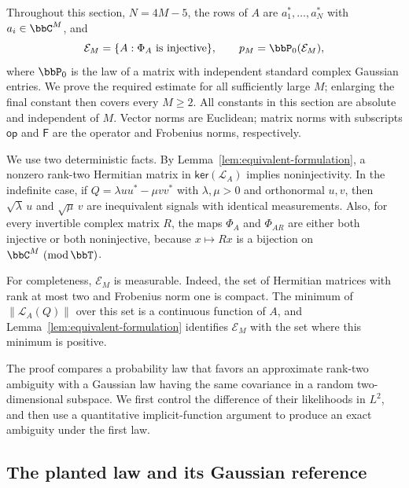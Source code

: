 \documentclass[11pt,reqno]{amsart}
\def\ker{{\mathsf{ker}}}
\begin{document}
Throughout this section, $N=4M-5$, the rows of $A$ are $a_1^*,\ldots,a_N^*$ with $a_i\in\bbC^M$, and
\[
 \mathcal E_M=\{A:\Phi_A\text{ is injective}\},\qquad
 p_M=\bbP_0(\mathcal E_M),
\]
where $\bbP_0$ is the law of a matrix with independent standard complex Gaussian entries. We prove the required estimate for all sufficiently large $M$; enlarging the final constant then covers every $M\ge2$. All constants in this section are absolute and independent of $M$.
Vector norms are Euclidean; matrix norms with subscripts $\mathsf{op}$ and $\mathsf{F}$ are the operator and Frobenius norms, respectively.

We use two deterministic facts. By Lemma~\ref{lem:equivalent-formulation}, a nonzero rank-two Hermitian matrix in $\ker(\mathcal L_A)$ implies noninjectivity. In the indefinite case, if $Q=\lambda uu^*-\mu vv^*$ with $\lambda,\mu>0$ and orthonormal $u,v$, then $\sqrt\lambda\,u$ and $\sqrt\mu\,v$ are inequivalent signals with identical measurements. Also, for every invertible complex matrix $R$, the maps $\Phi_A$ and $\Phi_{AR}$ are either both injective or both noninjective, because $x\mapsto Rx$ is a bijection on $\bbC^M\ (\operatorname{mod}\bbT)$.

For completeness, $\mathcal E_M$ is measurable. Indeed, the set of Hermitian matrices with rank at most two and Frobenius norm one is compact. The minimum of $\|\mathcal L_A(Q)\|$ over this set is a continuous function of $A$, and Lemma~\ref{lem:equivalent-formulation} identifies $\mathcal E_M$ with the set where this minimum is positive.

The proof compares a probability law that favors an approximate rank-two ambiguity with a Gaussian law having the same covariance in a random two-dimensional subspace. We first control the difference of their likelihoods in $L^2$, and then use a quantitative implicit-function argument to produce an exact ambiguity under the first law.

\subsection{The planted law and its Gaussian reference}
\end{document}

